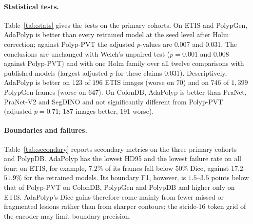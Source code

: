 \documentclass{ieeeaccess}
\begin{document}
\paragraph{Statistical tests.} Table~\ref{tab:stats} gives the tests on the primary cohorts. On ETIS and PolypGen, AdaPolyp is better than every retrained model at the seed level after Holm correction; against Polyp-PVT the adjusted $p$-values are $0.007$ and $0.031$. The conclusions are unchanged with Welch's unpaired test ($p=0.001$ and $0.008$ against Polyp-PVT) and with one Holm family over all twelve comparisons with published models (largest adjusted $p$ for these claims $0.031$). Descriptively, AdaPolyp is better on $123$ of $196$ ETIS images (worse on $70$) and on $746$ of $1{,}399$ PolypGen frames (worse on $647$). On ColonDB, AdaPolyp is better than PraNet, PraNet-V2 and SegDINO and not significantly different from Polyp-PVT (adjusted $p=0.71$; $187$ images better, $191$ worse).

\paragraph{Boundaries and failures.} Table~\ref{tab:secondary} reports secondary metrics on the three primary cohorts and PolypDB. AdaPolyp has the lowest HD95 and the lowest failure rate on all four; on ETIS, for example, $7.2\%$ of its frames fall below $50\%$ Dice, against $17.2$--$51.9\%$ for the retrained models. Its boundary F1, however, is $1.5$--$3.5$ points below that of Polyp-PVT on ColonDB, PolypGen and PolypDB and higher only on ETIS. AdaPolyp's Dice gains therefore come mainly from fewer missed or fragmented lesions rather than from sharper contours; the stride-$16$ token grid of the encoder may limit boundary precision.

\begin{table}[!t]
  \centering
  \caption{\textbf{Toolbox mean Dice on the standard test sets} (\%), the metric of published polyp tables. Published rows are copied from the papers; $^{\ddagger}$: the released training script selects its checkpoint on test data. Our rows: mean $\pm$ SD over $5$ seeds, final-epoch weights. \textbf{Bold}: best of our rows.}
  \label{tab:toolbox}
  \vspace{2pt}
  \setlength{\tabcolsep}{2.5pt}
\end{table}
\end{document}
